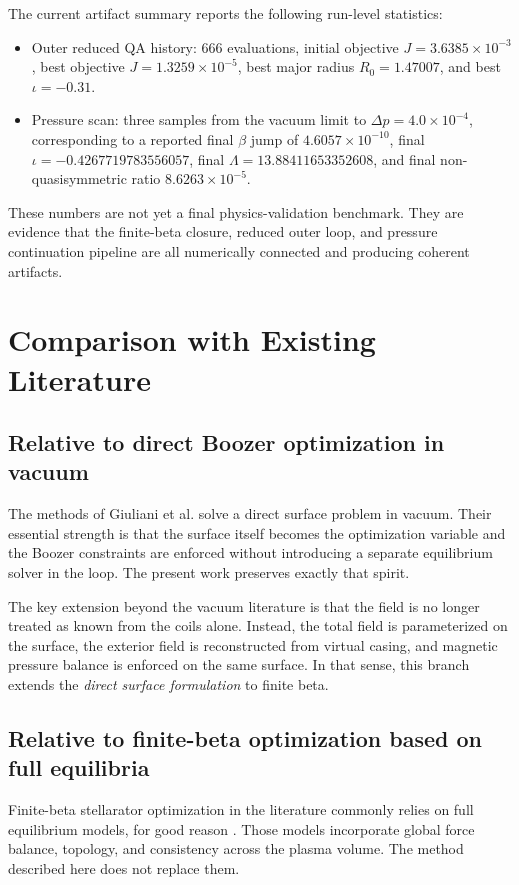 \documentclass[11pt]{article}
\begin{document}
The current artifact summary reports the following run-level statistics:

\begin{itemize}
\item Outer reduced QA history: $666$ evaluations, initial objective $J = 3.6385 \times 10^{-3}$, best objective $J = 1.3259 \times 10^{-5}$, best major radius $R_0 = 1.47007$, and best $\iota = -0.31$.
\item Pressure scan: three samples from the vacuum limit to $\Delta p = 4.0 \times 10^{-4}$, corresponding to a reported final $\beta$ jump of $4.6057 \times 10^{-10}$, final $\iota = -0.4267719783556057$, final $\Lambda = 13.88411653352608$, and final non-quasisymmetric ratio $8.6263 \times 10^{-5}$.
\end{itemize}

These numbers are not yet a final physics-validation benchmark. They are evidence that the finite-beta closure, reduced outer loop, and pressure continuation pipeline are all numerically connected and producing coherent artifacts.

\section{Comparison with Existing Literature}
\subsection{Relative to direct Boozer optimization in vacuum}
The methods of Giuliani et al. \cite{Giuliani2022,Giuliani2023} solve a direct surface problem in vacuum. Their essential strength is that the surface itself becomes the optimization variable and the Boozer constraints are enforced without introducing a separate equilibrium solver in the loop. The present work preserves exactly that spirit.

The key extension beyond the vacuum literature is that the field is no longer treated as known from the coils alone. Instead, the total field is parameterized on the surface, the exterior field is reconstructed from virtual casing, and magnetic pressure balance is enforced on the same surface. In that sense, this branch extends the \emph{direct surface formulation} to finite beta.

\subsection{Relative to finite-beta optimization based on full equilibria}
Finite-beta stellarator optimization in the literature commonly relies on full equilibrium models, for good reason \cite{Baillod2022,HirshmanWhitson1983}. Those models incorporate global force balance, topology, and consistency across the plasma volume. The method described here does not replace them.
\end{document}
